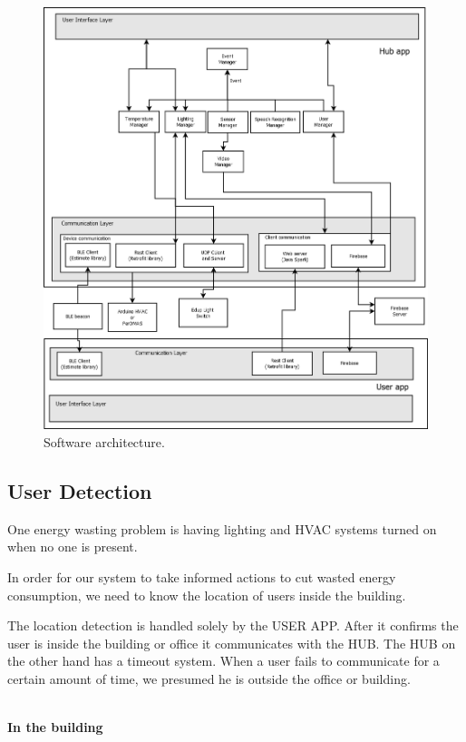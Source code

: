 \begin{figure}[H]
\centering
\includegraphics[width=1\textwidth]{Figures/software_dia}
\caption{Software architecture.}
\label{imp:software}
\end{figure}

\subsection{User Detection}\label{user_detection_imp}

One energy wasting problem is having lighting and \ac{HVAC} systems turned on when no one is present.


In order for our system to take informed actions to cut wasted energy consumption, we need to know the location of users inside the building.


The location detection is handled solely by the USER APP. After it confirms the user is inside the building or office it communicates with the HUB. The HUB on the other hand has a timeout system. When a user fails to communicate for a certain amount of time, we presumed he is outside the office or building.

\mbox{}\\
\textbf{In the building}

